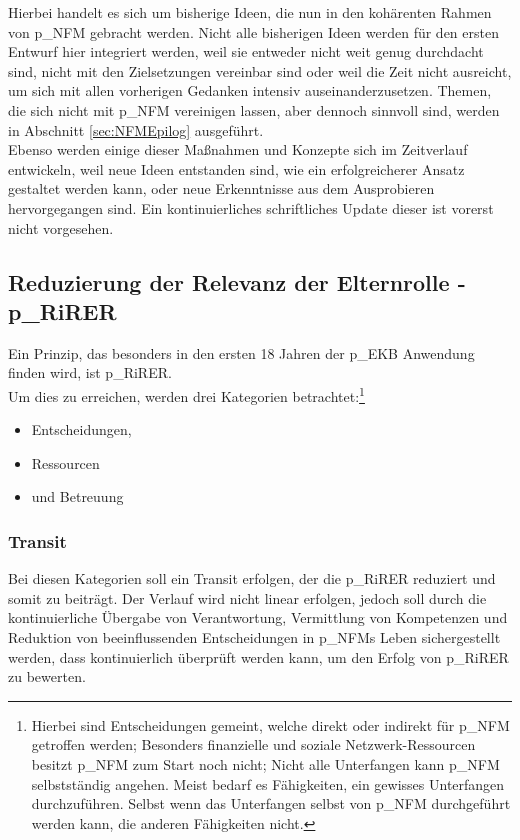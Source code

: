 Hierbei handelt es sich um bisherige Ideen, die nun in den kohärenten Rahmen von \gls{p_NFM} gebracht werden. Nicht alle bisherigen Ideen werden für den ersten Entwurf hier integriert werden, weil sie entweder nicht weit genug durchdacht sind, nicht mit den Zielsetzungen vereinbar sind oder weil die Zeit nicht ausreicht, um sich mit allen vorherigen Gedanken intensiv auseinanderzusetzen. Themen, die sich nicht mit \gls{p_NFM} vereinigen lassen, aber dennoch sinnvoll sind, werden in Abschnitt \ref{sec:NFMEpilog} ausgeführt.\\


Ebenso werden einige dieser Maßnahmen und Konzepte sich im Zeitverlauf entwickeln, weil neue Ideen entstanden sind, wie ein erfolgreicherer Ansatz gestaltet werden kann, oder neue Erkenntnisse aus dem Ausprobieren hervorgegangen sind. Ein kontinuierliches schriftliches Update dieser ist vorerst nicht vorgesehen.


\subsection{Reduzierung der Relevanz der Elternrolle - \gls{p_RiRER}}

Ein Prinzip, das besonders in den ersten 18 Jahren der \gls{p_EKB} Anwendung finden wird, ist \gls{p_RiRER}.\\


Um dies zu erreichen, werden drei Kategorien betrachtet:\footnote{
	Hierbei sind Entscheidungen gemeint, welche direkt oder indirekt für \gls{p_NFM} getroffen werden; Besonders finanzielle und soziale Netzwerk-Ressourcen besitzt \gls{p_NFM} zum Start noch nicht; Nicht alle Unterfangen kann \gls{p_NFM} selbstständig angehen. Meist bedarf es Fähigkeiten, ein gewisses Unterfangen durchzuführen. Selbst wenn das Unterfangen selbst von \gls{p_NFM} durchgeführt werden kann, die anderen Fähigkeiten nicht.
} 
\begin{itemize}
	\item Entscheidungen,
	\item Ressourcen
	\item und Betreuung
\end{itemize}

\subsubsection{Transit}
Bei diesen Kategorien soll ein Transit erfolgen, der die \gls{p_RiRER} reduziert und somit zu  beiträgt. Der Verlauf wird nicht linear erfolgen, jedoch soll durch die kontinuierliche Übergabe von Verantwortung, Vermittlung von Kompetenzen und Reduktion von beeinflussenden Entscheidungen in \gls{p_NFM}s Leben sichergestellt werden, dass  kontinuierlich überprüft werden kann, um den Erfolg von \gls{p_RiRER} zu bewerten. 

